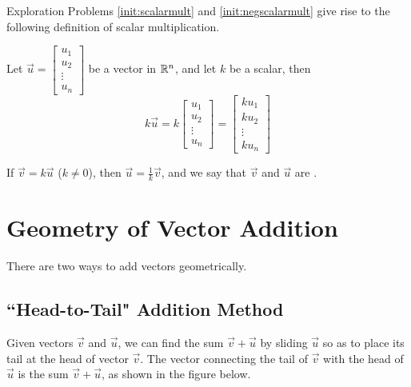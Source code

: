 \documentclass{ximera}
\begin{document}
Exploration Problems  \ref{init:scalarmult} and \ref{init:negscalarmult} give rise to the following definition of scalar multiplication.


  \begin{definition} 
  
Let $\vec{u}=\begin{bmatrix}
u_1\\
u_2\\
\vdots\\
u_n
\end{bmatrix}$ be a vector in $\mathbb{R}^n$, and let $k$ be a scalar, then
  $$k\vec{u}=k\begin{bmatrix}
u_1\\
u_2\\
\vdots\\
u_n
\end{bmatrix}=\begin{bmatrix}
ku_1\\
ku_2\\
\vdots\\
ku_n
\end{bmatrix}$$
  \end{definition}
If $\vec{v}=k\vec{u}$ ($k\neq 0$), then $\vec{u}=\frac{1}{k}\vec{v}$, and we say that $\vec{v}$ and $\vec{u}$ are .

\section*{Geometry of Vector Addition} 
There are two ways to add vectors geometrically.  
\subsection*{``Head-to-Tail" Addition Method}
Given vectors $\vec{v}$ and $\vec{u}$, we can find the sum $\vec{v}+\vec{u}$ by sliding $\vec{u}$ so as to place its tail at the head of vector $\vec{v}$.  The vector connecting the tail of $\vec{v}$ with the head of $\vec{u}$ is the sum $\vec{v}+\vec{u}$, as shown in the figure below.    
\begin{image}[4in]
\end{image}
\end{document}
